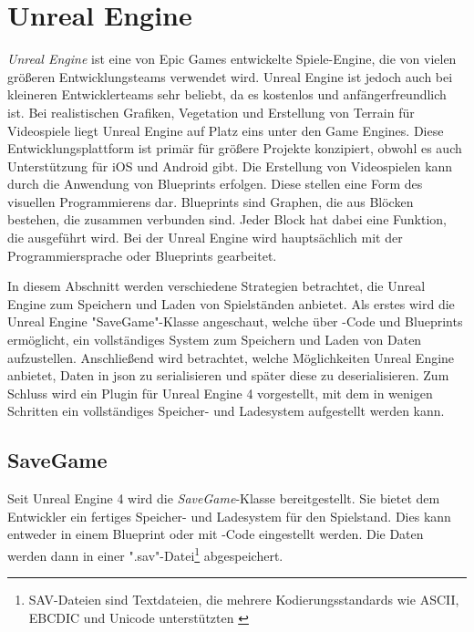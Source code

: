 \section{Unreal Engine}
\textit{Unreal Engine} ist eine von Epic Games entwickelte Spiele-Engine, die von vielen größeren Entwicklungsteams verwendet wird.\cite{linkedinUnrealEngine} Unreal Engine ist jedoch auch bei kleineren Entwicklerteams sehr beliebt, da es kostenlos und anfängerfreundlich ist. Bei realistischen Grafiken, Vegetation und Erstellung von Terrain für Videospiele liegt Unreal Engine auf Platz eins unter den Game Engines.\cite{vsmid2017comparison} Diese Entwicklungsplattform ist primär für größere Projekte konzipiert, obwohl es auch Unterstützung für iOS und Android gibt. Die Erstellung von Videospielen kann durch die Anwendung von Blueprints erfolgen. Diese stellen eine Form des visuellen Programmierens dar. Blueprints sind Graphen, die aus Blöcken bestehen, die zusammen verbunden sind. Jeder Block hat dabei eine Funktion, die ausgeführt wird. Bei der Unreal Engine wird hauptsächlich mit der Programmiersprache \cpp{} oder Blueprints gearbeitet.\cite{vsmid2017comparison}

In diesem Abschnitt werden verschiedene Strategien betrachtet, die Unreal Engine zum Speichern und Laden von Spielständen anbietet. Als erstes wird die Unreal Engine "SaveGame"-Klasse angeschaut, welche über \cpp{}-Code und Blueprints ermöglicht, ein vollständiges System zum Speichern und Laden von Daten aufzustellen. Anschließend wird betrachtet, welche Möglichkeiten Unreal Engine anbietet, Daten in \ac{json} zu serialisieren und später diese zu deserialisieren. Zum Schluss wird ein Plugin für Unreal Engine 4 vorgestellt, mit dem in wenigen Schritten ein vollständiges Speicher- und Ladesystem aufgestellt werden kann. 



\subsection{SaveGame}
Seit Unreal Engine 4 wird die \textit{SaveGame}-Klasse bereitgestellt. Sie bietet dem Entwickler ein fertiges Speicher- und Ladesystem für den Spielstand. Dies kann entweder in einem Blueprint oder mit \cpp{}-Code eingestellt werden. Die Daten werden dann in einer ".sav"-Datei\footnote{SAV-Dateien sind Textdateien, die mehrere Kodierungsstandards wie ASCII, EBCDIC und Unicode unterstützten \cite{filextSavDatei}} abgespeichert.\cite{unrealengineSavingLoading}

